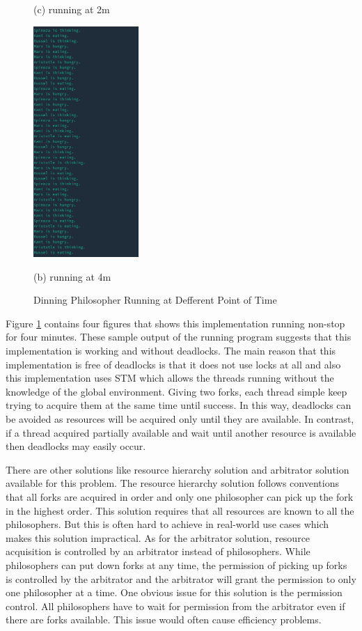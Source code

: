 \documentclass{article}
\begin{document}
\begin{normalsize}
\begin{figure}[H]
\begin{minipage}[b]{0.24\linewidth}
      \centerline{ (c) running at 2m}\medskip
    \end{minipage}
    \hfill
    \begin{minipage}[b]{0.24\linewidth}
      \centering
      \centerline{\includegraphics[width=4.0cm]{dinning4m}}
      \centerline{ (b) running at 4m}\medskip
    \end{minipage}

    \caption{Dinning Philosopher Running at Defferent Point of Time}
    \label{fig:drunning}
  \end{figure}

  Figure \ref{fig:drunning} contains four figures that shows this implementation
  running non-stop for four minutes. These sample output of the running program suggests that this implementation is working and without deadlocks. The main reason that this implementation is free of deadlocks is that it does not use locks at all and also this implementation uses STM which allows the threads running without the knowledge of the global environment. Giving two forks,
  each thread simple keep trying to acquire them at the same time until success. In this way, deadlocks can be avoided as resources will be acquired only until they are available. In contrast, if a thread acquired partially available and wait until another resource is available then deadlocks may easily occur.

  There are other solutions like resource hierarchy solution and arbitrator solution available for this problem. The resource hierarchy solution follows conventions that all forks are acquired in order and only one philosopher can pick up the fork in the highest order. This solution requires that all resources are known to all the philosophers. But this is often hard to achieve in real-world use cases which makes this solution impractical. As for the arbitrator solution, resource acquisition is controlled by an arbitrator instead of philosophers. While philosophers can put down forks at any time, the permission of picking up forks is controlled by the arbitrator and the arbitrator will grant the permission to only one philosopher at a time. One obvious issue for this solution is the permission control. All philosophers have to wait for permission from the arbitrator even if there are forks available. This issue would often cause efficiency problems.


\end{normalsize}
\end{document}
